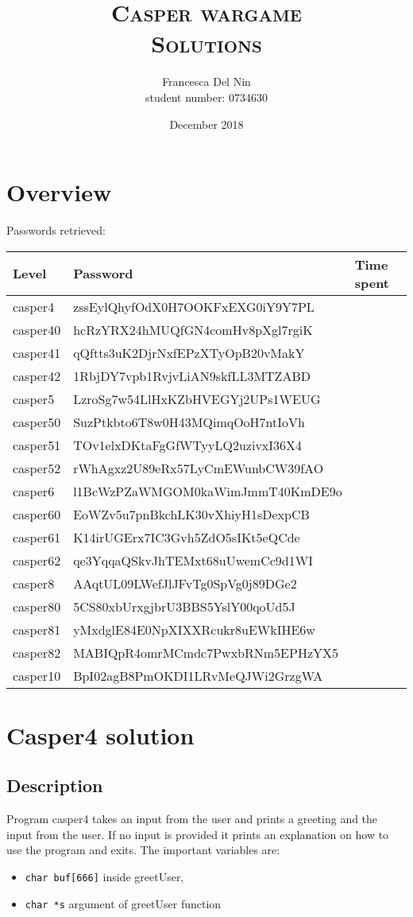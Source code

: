 \documentclass[a4paper,12pt]{article}
\title{\scshape Casper wargame \\ Solutions}
\author{Francesca Del Nin \\ student number: 0734630}
\date{December 2018}
\begin{document}
\maketitle

\tableofcontents

\newpage
\section{Overview}
Passwords retrieved:
\begin{table}[]
\begin{tabular}{l|l|l}
 Level & Password & Time spent  \\
 \hline
 casper4 & zssEylQhyfOdX0H7OOKFxEXG0iY9Y7PL &   \\
 casper40 & hcRzYRX24hMUQfGN4comHv8pXgl7rgiK & \\
 casper41 & qQftts3uK2DjrNxfEPzXTyOpB20vMakY & \\
 casper42 & 1RbjDY7vpb1RvjvLiAN9skfLL3MTZABD & \\
  \hline
 casper5 & LzroSg7w54LlHxKZbHVEGYj2UPs1WEUG & \\
 casper50 & SuzPtkbto6T8w0H43MQimqOoH7ntIoVh & \\
 casper51 & TOv1elxDKtaFgGfWTyyLQ2uzivxI36X4 & \\
 casper52 & rWhAgxz2U89eRx57LyCmEWunbCW39fAO & \\
  \hline
 casper6 & l1BcWzPZaWMGOM0kaWimJmmT40KmDE9o &  \\
 casper60 & EoWZv5u7pnBkchLK30vXhiyH1sDexpCB & \\
 casper61 & K14irUGErx7IC3Gvh5ZdO5sIKt5eQCde & \\
 casper62 & qe3YqqaQSkvJhTEMxt68uUwemCc9d1WI & \\
  \hline
 casper8 & AAqtUL09LWefJlJFvTg0SpVg0j89DGe2 & \\
 casper80 & 5CS80xbUrxgjbrU3BBS5YslY00qoUd5J & \\
 casper81 & yMxdglE84E0NpXIXXRcukr8uEWkIHE6w & \\
 casper82 & MABIQpR4omrMCmdc7PwxbRNm5EPHzYX5 & \\
  \hline
 casper10 & BpI02agB8PmOKDI1LRvMeQJWi2GrzgWA &\\
\end{tabular}
\end{table}

\newpage
\section{Casper4 solution}
\subsection{Description}
Program casper4 takes an input from the user and prints a greeting and the input from the user. If no input is provided it prints an explanation on how to use the program and exits. The important variables are:
\begin{itemize}
\item \texttt{char buf[666]} inside greetUser,
\item \texttt{char *s} argument of greetUser function
\end{itemize}
 
\end{document}
